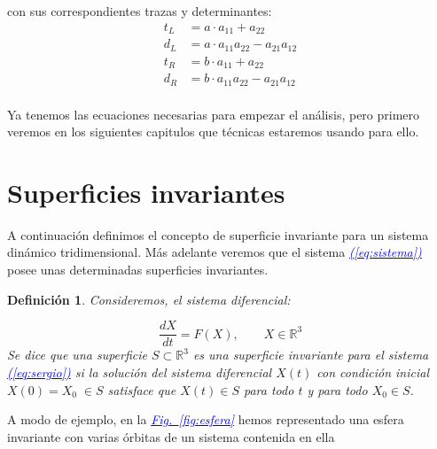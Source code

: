 \documentclass[12pt,a4paper]{report} %
\newtheorem{definicion}{Definición}[chapter] %
\newcommand{\fref}[1]{\hyperref[#1]{\textcolor{blue}{\textit{Fig.~\ref*{#1}}}}}
\newcommand{\eref}[1]{\hyperref[#1]{\textcolor{blue}{\textit{(\ref*{#1})}}}}
\begin{document}
    con sus correspondientes trazas y determinantes:
    \begin{equation}
    \begin{aligned}
    	t_L &= a \cdot a_{11} + a_{22}\\
    	d_L &= a \cdot a_{11}a_{22} - a_{21}a_{12}\\
    	t_R &= b \cdot a_{11} + a_{22}\\
    	d_R &= b \cdot a_{11}a_{22} - a_{21}a_{12}\\
    \end{aligned}
    \end{equation}\smallskip
    
	Ya tenemos las ecuaciones necesarias para empezar el análisis, pero primero veremos en los siguientes capitulos que técnicas estaremos usando para ello.
	\newpage
	\section{Superficies invariantes}
	\label{sec:2.4}
	\noindent A continuación definimos el concepto de superficie invariante para un sistema dinámico tridimensional. Más adelante veremos que el sistema \eref{eq:sistema} posee unas determinadas superficies invariantes. 
	
	\begin{definicion}
		Consideremos, el sistema diferencial:
		
		\begin{equation}
			\label{eq:sergio}
			\frac{dX}{dt}=F(X),\qquad X\in \mathbb{R}^3
		\end{equation}\smallskip
		Se dice que una superficie $S\subset \mathbb{R}^3$ es una superficie invariante para el sistema \eref{eq:sergio} si la solución del sistema diferencial $X(t)$ con condición inicial $X(0)=X_0 \; \in S$ satisface que $X(t) \in S$ para todo $t$ y para todo $X_0 \in S$.
	\end{definicion}\smallskip
	
	A modo de ejemplo, en la \fref{fig:esfera} hemos representado una esfera invariante con varias órbitas de un sistema contenida en ella
	
\end{document}
